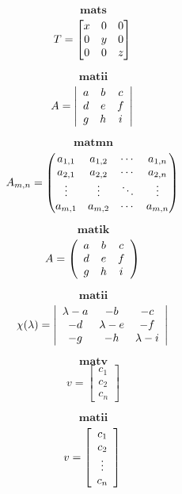 \documentclass[10pt]{article}
\begin{document}
$$\textbf{mats}$$
\[
    T =\begin{bmatrix}
            x & 0 & 0\\
            0 & y & 0\\   
            0 & 0 & z  
    \end{bmatrix} \\
\]

$$\textbf{matii}$$
\[
    A = \left| \begin{array}{ccc}
    a & b & c \\
    d & e & f \\
    g & h & i \end{array} \right|  \\
\]

$$\textbf{matmn}$$
\[
    A_{m,n} = 
    \begin{pmatrix}
    a_{1,1} & a_{1,2} & \cdots & a_{1,n} \\
    a_{2,1} & a_{2,2} & \cdots & a_{2,n} \\
    \vdots  & \vdots  & \ddots & \vdots  \\
    a_{m,1} & a_{m,2} & \cdots & a_{m,n} 
    \end{pmatrix} \\
\]

$$\textbf{matik}$$
\[
    A =\left( \begin{array}{ccc}
    a & b & c \\
    d & e & f \\
    g & h & i \end{array} \right)\\
\]

$$\textbf{matii}$$
\[
    \chi(\lambda) = \left| \begin{array}{ccc}
    \lambda - a & -b & -c \\
    -d & \lambda - e & -f \\
    -g & -h & \lambda - i \end{array} \right| \\
\]

$$\textbf{matv}$$
\[
    v =\left[ \begin{array}{cc} 
    c_1 \\
    c_2 \\
    c_n
    \end{array} 
    \right] 
\]

$$\textbf{matii}$$
\[
    v =\left[ \begin{array}{cc} 
    c_1 \\
    c_2 \\
    \vdots \\
    c_n
    \end{array} 
    \right] \\
\]
\end{document}
